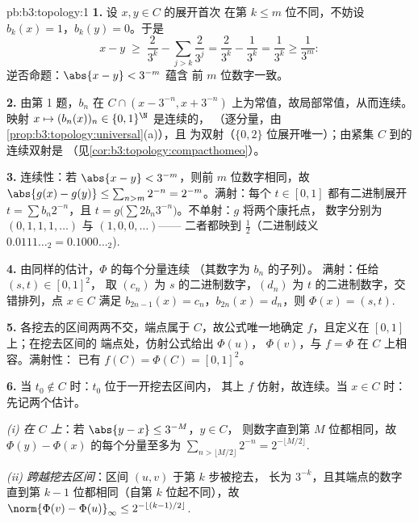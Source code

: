 \begin{solution}{pb:b3:topology:1}
\textbf{1.} 设 $x, y \in C$ 的展开首次
在第 $k \leq m$ 位不同，不妨设 $b_k(x) = 1$，$b_k(y) = 0$。于是
\[
x - y \;\geq\; \frac{2}{3^k} - \sum_{j > k}\frac{2}{3^j}
= \frac{2}{3^k} - \frac{1}{3^k} = \frac1{3^k} \geq \frac1{3^m}:
\]
逆否命题：$\abs{x - y} < 3^{-m}$ 蕴含
前 $m$ 位数字一致。

\textbf{2.} 由第 1 题，$b_n$ 在 $C \cap (x -
3^{-n}, x + 3^{-n})$ 上为常值，故局部常值，从而连续。
映射 $x \mapsto (b_n(x))_n \in \{0,1\}^\N$ 是连续的，
（逐分量，由\cref{prop:b3:topology:universal}(a)），且
为双射（$\{0,2\}$ 位展开唯一）；由紧集
$C$ 到的连续双射是
（见\cref{cor:b3:topology:compacthomeo}）。

\textbf{3.} 连续性：若 $\abs{x - y} < 3^{-m}$，则前
$m$ 位数字相同，故 $\abs{g(x) - g(y)} \leq \sum_{n > m}2^{-n}
= 2^{-m}$。满射：每个 $t \in [0,1]$ 都有二进制展开
$t = \sum b_n2^{-n}$，且 $t = g\bigl(\sum
2b_n3^{-n}\bigr)$。不单射：$g$ 将两个康托点，
数字分别为 $(0,1,1,1,\dots)$ 与 $(1,0,0,\dots)$——
二者都映到 $\frac12$（二进制歧义 $0.0111\ldots_2 =
0.1000\ldots_2$).

\textbf{4.} 由同样的估计，$\Phi$ 的每个分量连续
（其数字为 $b_n$ 的子列）。
满射：任给 $(s, t) \in [0,1]^2$，
取 $(c_n)$ 为 $s$ 的二进制数字，$(d_n)$ 为 $t$ 的二进制数字，交错排列，点 $x
\in C$ 满足 $b_{2n-1}(x) = c_n$，$b_{2n}(x) = d_n$，则
$\Phi(x) = (s,t)$.

\textbf{5.} 各挖去的区间两两不交，端点属于
$C$，故公式唯一地确定 $f$，且定义在 $[0,1]$ 上；在挖去区间的
端点处，仿射公式给出 $\Phi(u)$，
$\Phi(v)$，与 $f = \Phi$ 在 $C$ 上相容。满射性：
已有 $f(C) = \Phi(C) = [0,1]^2$。

\textbf{6.} 当 $t_0 \notin C$ 时：$t_0$ 位于一开挖去区间内，
其上 $f$ 仿射，故连续。当 $x \in C$ 时：
先记两个估计。

\emph{(i) 在 $C$ 上}：若 $\abs{y - x} \leq 3^{-M}$，$y \in C$，
则数字直到第 $M$ 位都相同，故 $\Phi(y)
- \Phi(x)$ 的每个分量至多为 $\sum_{n > \lfloor M/2\rfloor} 2^{-n} =
2^{-\lfloor M/2\rfloor}$.

\emph{(ii) 跨越挖去区间}：区间 $(u,v)$ 于第 $k$ 步被挖去，
长为 $3^{-k}$，且其端点的数字
直到第 $k - 1$ 位都相同（自第 $k$ 位起不同），故
$\norm{\Phi(v) - \Phi(u)}_\infty \leq
2^{-\lfloor (k-1)/2\rfloor}$.


\end{solution}
